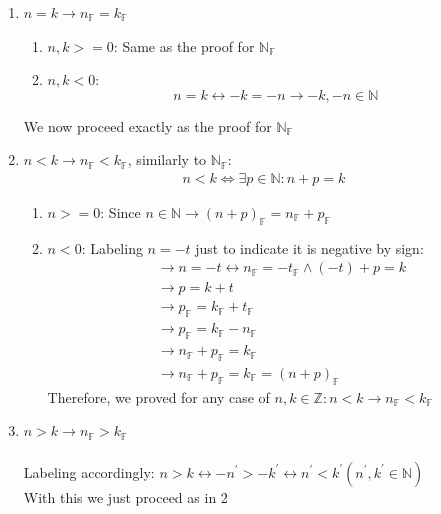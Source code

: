 \begin{bookproof}
\begin{enumerate}
\item $n = k \rightarrow n_\mathbb{F} = k_\mathbb{F}$
\begin{enumerate}
\item $n, k >= 0$: Same as the proof for $\mathbb{N_F}$
\item $n, k < 0$: $$n = k \leftrightarrow -k = -n \rightarrow -k, -n \in \mathbb{N}$$
\end{enumerate}
We now proceed exactly as the proof for $\mathbb{N_F}$

\item $n < k \rightarrow n_\mathbb{F} < k_\mathbb{F}$, similarly to $\mathbb{N_F}$:
\begin{align*}
n < k \Leftrightarrow \exists p \in \mathbb{N}: n + p = k
\end{align*}

\begin{enumerate}
\item $n >= 0$: Since $n \in \mathbb{N} \rightarrow (n + p)_\mathbb{F} = n_\mathbb{F} + p_\mathbb{F}$

\item $n < 0$: Labeling $n = -t$ just to indicate it is negative by sign:
\begin{align*}
&\rightarrow n = -t \leftrightarrow n_\mathbb{F} = -t_\mathbb{F} \wedge (-t) + p = k \\
&\rightarrow p = k + t \\
&\rightarrow p_\mathbb{F} = k_\mathbb{F} + t_\mathbb{F} \\
&\rightarrow p_\mathbb{F} = k_\mathbb{F} - n_\mathbb{F} \\
&\rightarrow n_\mathbb{F} + p_\mathbb{F} = k_\mathbb{F} \\
&\rightarrow n_\mathbb{F} + p_\mathbb{F} = k_\mathbb{F} = (n + p)_\mathbb{F}
\end{align*}
Therefore, we proved for any case of $n, k \in \mathbb{Z}: n < k \rightarrow n_\mathbb{F} < k_\mathbb{F}$
\end{enumerate}

\item $n > k \rightarrow n_\mathbb{F}> k_\mathbb{F}$
\\\\
Labeling accordingly: $n > k \leftrightarrow -n^\prime > -k^\prime \leftrightarrow n^\prime < k^\prime (n^\prime, k^\prime \in \mathbb{N})$\\
With this we just proceed as in 2
\end{enumerate}
\end{bookproof}

